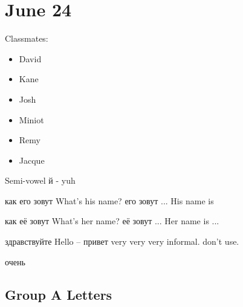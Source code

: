 \documentclass{article}
\begin{document}
\section{June 24}
\label{sec:june-24}


Classmates:
\begin{itemize}
\item David
\item Kane
\item Josh
\item Miniot
\item Remy
\item Jacque
\end{itemize}
\newcommand{\inR}[1]{\foreignlanguage{russian}{#1}}

Semi-vowel \inR{й} - yuh

\inR{как его зовут}  What's his name?
\inR{его зовут ...}  His name is

\inR{как её зовут}  What's her name?
\inR{её зовут ...}  Her name is ...

\inR{здравствуйте}  Hello  -- \inR{привет}  very very very informal. don't use.


\inR{очень }

\subsection{Group A Letters}
\label{sec:group-letters}
\end{document}
